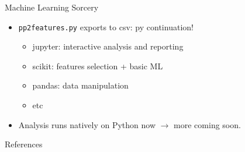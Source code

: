 \documentclass[pdf]
{beamer}
\begin{document}
\begin{frame}{Machine Learning Sorcery}
	\begin{itemize}
		\item \texttt{pp2features.py} exports to csv: py continuation!
		\begin{itemize}
			\item jupyter: interactive analysis and reporting
			\item scikit: features selection + basic ML
			\item pandas: data manipulation
			\item etc
		\end{itemize}
		\item Analysis runs natively on Python now $\rightarrow$ more coming soon.
	\end{itemize}
\end{frame}


\begin{frame}{References}

\end{frame}
\end{document}
